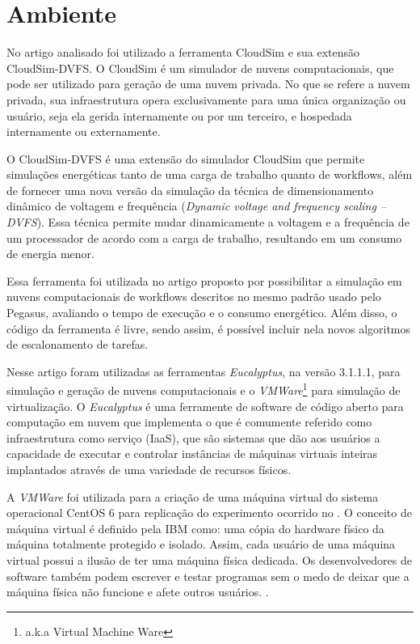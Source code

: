 \section{Ambiente}

No artigo analisado foi utilizado a ferramenta CloudSim e sua extensão CloudSim-DVFS. O CloudSim é
um simulador de nuvens computacionais, que pode ser utilizado para geração de uma nuvem privada.
No que se refere a nuvem privada, sua infraestrutura opera exclusivamente para uma única organização ou usuário,
seja ela gerida internamente ou por um terceiro, e hospedada internamente ou externamente.

O CloudSim-DVFS é uma extensão do simulador CloudSim que permite simulações energéticas tanto de uma
carga de trabalho quanto de workflows, além de fornecer uma nova versão da simulação da técnica
de dimensionamento dinâmico de voltagem e frequência (\textit{Dynamic voltage and frequency scaling – DVFS}).
Essa técnica permite mudar dinamicamente a voltagem e a frequência de um processador de acordo com
a carga de trabalho, resultando em um consumo de energia menor. \cite{elaine_et_al:14}

Essa ferramenta foi utilizada no artigo \cite{elaine_et_al:14} proposto por possibilitar a simulação em nuvens computacionais
de workflows descritos no mesmo padrão usado pelo Pegasus, avaliando o tempo de execução e o consumo energético.
Além disso, o código da ferramenta é livre, sendo assim, é possível incluir nela novos algoritmos de escalonamento de tarefas.

Nesse artigo foram utilizadas as ferramentas \textit{Eucalyptus}, na versão 3.1.1.1, para simulação e geração de nuvens computacionais
e o \textit{VMWare}\footnote{a.k.a Virtual Machine Ware} para simulação de virtualização. O \textit{Eucalyptus}
é uma ferramente de software de código aberto para computação em nuvem que implementa o que é comumente referido
como infraestrutura como serviço (IaaS), que são sistemas que dão aos usuários a capacidade de executar e controlar
instâncias de máquinas virtuais inteiras implantados através de uma variedade de recursos físicos. \cite{nurmi_2009}

A \textit{VMWare} foi utilizada para a criação de uma máquina virtual do sistema operacional CentOS 6 para replicação do experimento
ocorrido no \cite{elaine_et_al:14}. O conceito de máquina virtual é definido pela IBM como: uma cópia do hardware físico da máquina totalmente protegido
e isolado. Assim, cada usuário de uma máquina virtual possui a ilusão de ter uma máquina física dedicada.
Os desenvolvedores de software também podem escrever e testar programas sem o medo de deixar que a máquina física
não funcione e afete outros usuários. \cite{sugerman2001virtualizing}.
